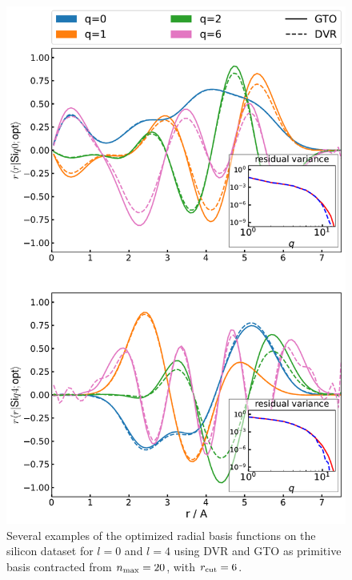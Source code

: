 

\begin{figure}[tbhp]
    \centering
    \includegraphics[width=0.7\linewidth]{fig/optbasis/contracted_radial_basis_two_angular_plot-silicon.pdf}
    \caption{Several examples of the optimized radial basis functions on the silicon dataset for $l=0$ and $l=4$ using DVR and GTO as primitive basis contracted from $n_\mathrm{max}=20$, with ${r_\mathrm{cut}}=6$. }%
    \label{fig:oel-radial-basis}
\end{figure}



